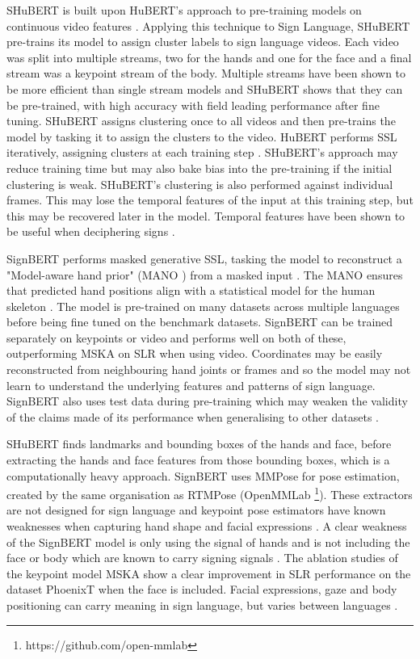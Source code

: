 \documentclass{article}
\begin{document}
SHuBERT is built upon HuBERT's approach to pre-training models on continuous video features \cite{hsu_hubert_2021}. Applying this technique to Sign Language, SHuBERT pre-trains its model to assign cluster labels to sign language videos. Each video was split into multiple streams, two for the hands and one for the face and a final stream was a keypoint stream of the body. Multiple streams have been shown to be more efficient than single stream models and SHuBERT shows that they can be pre-trained, with high accuracy with field leading performance after fine tuning. SHuBERT assigns clustering once to all videos and then pre-trains the model by tasking it to assign the clusters to the video. HuBERT performs SSL iteratively, assigning clusters at each training step \cite{hsu_hubert_2021}. SHuBERT's approach may reduce training time but may also bake bias into the pre-training if the initial clustering is weak. SHuBERT's clustering is also performed against individual frames. This may lose the temporal features of the input at this training step, but this may be recovered later in the model. Temporal features have been shown to be useful when deciphering signs \cite{hu_corrnet_2024} \cite{shi_decoupled_2020}.

SignBERT performs masked generative SSL, tasking the model to reconstruct a "Model-aware hand prior" (MANO  \cite{romero_embodied_2017}) from a masked input \cite{hu_signbert_2023}. The MANO ensures that predicted hand positions align with a statistical model for the human skeleton . The model is pre-trained on many datasets across multiple languages before being fine tuned on the benchmark datasets. SignBERT can be trained separately on keypoints or video and performs well on both of these, outperforming MSKA on SLR when using video. Coordinates may be easily reconstructed from neighbouring hand joints or frames and so the model may not learn to understand the underlying features and patterns of sign language. SignBERT also uses test data during pre-training which may weaken the validity of the claims made of its performance when generalising to other datasets \cite{hu_signbert_2023}.

SHuBERT finds landmarks and bounding boxes of the hands and face, before extracting the hands and face features from those bounding boxes, which is a computationally heavy approach. SignBERT uses MMPose \cite{mmpose2020} for pose estimation, created by the same organisation as RTMPose (OpenMMLab \footnote{https://github.com/open-mmlab}). These extractors are not designed for sign language and keypoint pose estimators have known weaknesses when capturing hand shape and facial expressions \cite{gueuwou_shubert_2025} \cite{moryossef_evaluating_2021}. A clear weakness of the SignBERT model is only using the signal of hands and is not including the face or body which are known to carry signing signals \cite{hu_signbert_2023}. The ablation studies of the keypoint model MSKA show a clear improvement in SLR performance on the dataset PhoenixT when the face is included. Facial expressions, gaze and body positioning can carry meaning in sign language, but varies between languages \cite{kim_signbleu_2024} \cite{el-alfy_comprehensive_2022}.
\end{document}
